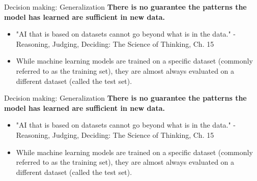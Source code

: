 \documentclass[8pt]{beamer}
\begin{document}
	\begin{frame}[t]{Decision making: Generalization} %
		\centering
		\textbf{There is no guarantee the patterns the model has learned are sufficient in new data.}
		\begin{itemize}
			\item "AI that is based on datasets cannot go beyond what is in the data." -Reasoning, Judging, Deciding: The Science of Thinking, Ch. 15
			\item While machine learning models are trained on a specific dataset (commonly referred to as the training set), they are almost always evaluated on a different dataset (called the test set).
		\end{itemize}
		\vspace{0.5cm}
	\end{frame}

	\begin{frame}[t]{Decision making: Generalization} %
		\centering
		\textbf{There is no guarantee the patterns the model has learned are sufficient in new data.}
		\begin{itemize}
			\item "AI that is based on datasets cannot go beyond what is in the data." - Reasoning, Judging, Deciding: The Science of Thinking, Ch. 15
			\item While machine learning models are trained on a specific dataset (commonly referred to as the training set), they are almost always evaluated on a different dataset (called the test set).
		\end{itemize}
		\vspace{0.5cm}
	\end{frame}
\end{document}
